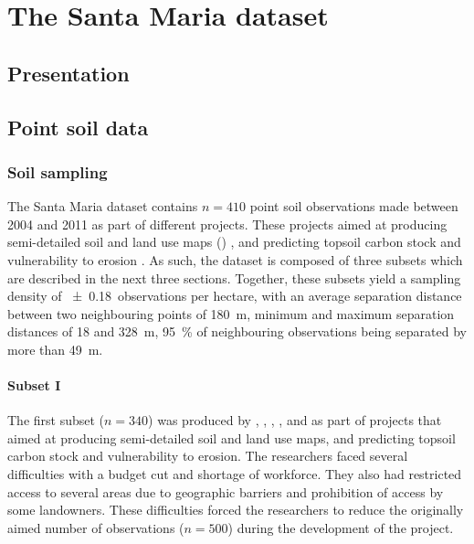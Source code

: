\artigofalse
\chapter{The Santa Maria dataset}
\label{apen:database}

\tocless\section{Presentation}




\tocless\section{Point soil data}

\tocless\subsection{Soil sampling}

The Santa Maria dataset contains $n = 410$ point soil observations made between 2004 and 2011 as part of
different projects. These projects aimed at producing semi-detailed soil and land use maps ()
\cite{Pedron2005,Miguel2010,SamuelRosaEtAl2011a,MiguelEtAl2012}, and predicting topsoil carbon stock and 
vulnerability to erosion \cite{Samuel-Rosa2009,MouraBueno2012,Miguel2013}. As such, the dataset is composed 
of three subsets which are described in the next three sections. Together, these subsets yield a sampling 
density of \num{\pm0.18}~observations per hectare, with an average separation distance between two neighbouring points of \SI{180}{\metre}, minimum and maximum separation distances of \num{18} and 
\SI{328}{\metre}, \SI{95}{\percent} of neighbouring observations being separated by more than 
\SI{49}{\metre}.

\tocless\subsubsection{Subset I}

The first subset ($n = 340$) was produced by , , 
, , and  as part
of projects that aimed at producing semi-detailed soil and land use maps, and predicting topsoil carbon stock 
and vulnerability to erosion. The researchers faced several difficulties with a budget cut and shortage 
of workforce. They also had restricted access to several areas due to geographic barriers and prohibition of 
access by some landowners. These difficulties forced the researchers to reduce the originally aimed number of 
observations ($n = 500$) during the development of the project.

